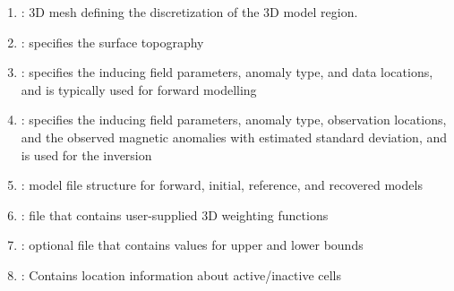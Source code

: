 \begin{enumerate}
\item {}: 3D mesh defining the discretization of the 3D model region.
\item {}: specifies the surface topography
\item {}: specifies the inducing field parameters, anomaly type, and data locations, and is typically used for forward modelling
\item {}: specifies the inducing field parameters, anomaly type, observation locations, and the observed magnetic anomalies with estimated standard deviation, and is used for the inversion
\item {}: model file structure for forward, initial, reference, and recovered models
\item {}: file that contains user-supplied 3D weighting functions
\item {}: optional file that contains values for upper and lower bounds
\item {}: Contains location information about active/inactive cells
\end{enumerate}















